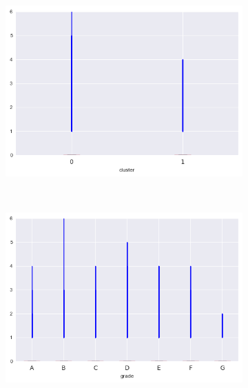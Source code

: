 \begin{apendicesenv}
\begin{figure}[t!]
\begin{subfigure}[t]{0.5\textwidth}
			\centerline{\includegraphics[width=1.05\textwidth]{img/delinq_2yrs_by_cluster}}
    	\end{subfigure}%
    	~ 
    	\begin{subfigure}[t]{0.5\textwidth}
    		\centering
   
			\centerline{\includegraphics[width=1.05\textwidth]{img/delinq_2yrs_by_grade}}

    	\end{subfigure}
\\
    	        \caption{recoveries}
    	\begin{subfigure}[t]{0.5\textwidth}
    		\centering


\end{subfigure}
\end{figure}
\end{apendicesenv}
